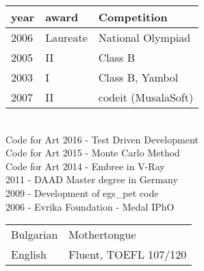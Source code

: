 \vspace{-0.4cm}
\begin{tabular}{ p{} p{} p{} }
year & award & Competition \\
\hline
2006 & Laureate  & National Olympiad \\
2005 & II        & Class B \\
2003 & I         & Class B, Yambol \\
2007 & II        & codeit (MusalaSoft)\\
\end{tabular}\\
\vspace{-0.4cm}
Code for Art 2016 - Test Driven Development \\
Code for Art 2015 - Monte Carlo Method \\
Code for Art 2014 - Embree in V-Ray\\
\vspace{-0.4cm}
2011 - DAAD Master degree in Germany \\
2009 - Development of egs\_pet code \\
2006 - Evrika Foundation - Medal IPhO\\
\vspace{-0.4cm}
\begin{tabular}{ l l }
Bulgarian & Mothertongue \\
English   & Fluent, TOEFL 107/120\\
\end{tabular}\\
